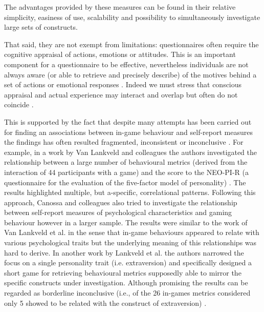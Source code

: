 The advantages provided by these measures can be found in their relative simplicity, easiness of use, scalability and possibility to simultaneously investigate large sets of constructs. 

That said, they are not exempt from limitations: questionnaires often require the cognitive appraisal of actions, emotions or attitudes. This is an important component for a questionnaire to be effective, nevertheless individuals are not always aware (or able to retrieve and precisely describe) of the motives behind a set of actions or emotional responses \cite{avserivskis2017computational}. Indeed we must stress that conscious appraisal and actual experience may interact and overlap but often do not coincide \cite{poeller2018let}. 

This is supported by the fact that despite many attempts has been carried out for finding an associations between in-game behaviour and self-report measures the findings has often resulted fragmented, inconsistent or inconclusive \cite{canossa2013give, stankevicius2015factor, schaekermann2017curiously}. For example, in a work by Van Lankveld and colleagues \cite{van2009psychologically} the authors investigated the relationship between a large number of behavioural metrics (derived from the interaction of 44 participants with a game) and the score to the NEO-PI-R (a questionnaire for the evaluation of the five-factor model of personality) \cite{costa2008revised}. The results highlighted multiple, but a-specific, correlational patterns. Following this approach, Canossa and colleagues \cite{canossa2013give} also tried to investigate the relationship between self-report measures of psychological characteristics and gaming behaviour however in a larger sample. The results were similar to the work of Van Lankveld et al. in the sense that in-game behaviours appeared to relate with various psychological traits but the underlying meaning of this relationships was hard to derive. In another work by Lankveld et al. the authors narrowed the focus on a single personality trait (i.e. extraversion)  and specifically designed a short game for retrieving behavioural metrics supposedly able to mirror the specific constructs under investigation. Although promising the results can be regarded as borderline inconclusive (i.e., of the 26 in-games metrics considered only 5 showed to be related with the construct of extraversion) \cite{van2011games}. 

